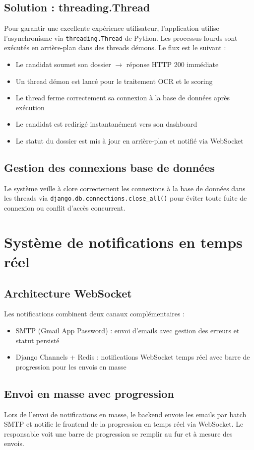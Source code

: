 \subsection{Solution : threading.Thread}
Pour garantir une excellente expérience utilisateur, l'application utilise l'asynchronisme via \texttt{threading.Thread} de Python. Les processus lourds sont exécutés en arrière-plan dans des threads démons. Le flux est le suivant :
\begin{itemize}
\item Le candidat soumet son dossier $\rightarrow$ réponse HTTP 200 immédiate
\item Un thread démon est lancé pour le traitement OCR et le scoring
\item Le thread ferme correctement sa connexion à la base de données après exécution
\item Le candidat est redirigé instantanément vers son dashboard
\item Le statut du dossier est mis à jour en arrière-plan et notifié via WebSocket
\end{itemize}

\subsection{Gestion des connexions base de données}
Le système veille à clore correctement les connexions à la base de données dans les threads via \texttt{django.db.connections.close\_all()} pour éviter toute fuite de connexion ou conflit d'accès concurrent.

\section{Système de notifications en temps réel}
\subsection{Architecture WebSocket}
Les notifications combinent deux canaux complémentaires :
\begin{itemize}
\item SMTP (Gmail App Password) : envoi d'emails avec gestion des erreurs et statut persisté
\item Django Channels + Redis : notifications WebSocket temps réel avec barre de progression pour les envois en masse
\end{itemize}

\subsection{Envoi en masse avec progression}
Lors de l'envoi de notifications en masse, le backend envoie les emails par batch SMTP et notifie le frontend de la progression en temps réel via WebSocket. Le responsable voit une barre de progression se remplir au fur et à mesure des envois.

